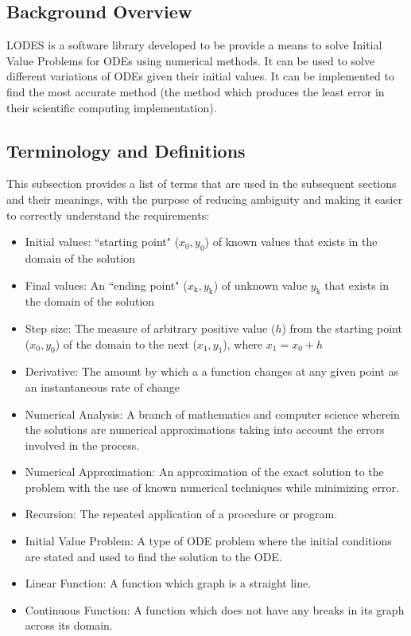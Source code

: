 \documentclass[12pt]{article}
\newcommand{\famname}{LODES} %
\begin{document}
\subsection{Background Overview} \label{Sec_Background}
\famname{} is a software library developed to be provide a means to solve Initial Value
Problems for ODEs using numerical methods. It can be used to solve different variations of ODEs
given their initial values. It can be implemented to find the most accurate method (the method
which produces the least error in their scientific computing implementation).

\subsection{Terminology and  Definitions}

This subsection provides a list of terms that are used in the subsequent
sections and their meanings, with the purpose of reducing ambiguity and making it
easier to correctly understand the requirements:

\begin{itemize}

\item Initial values: ``starting point" ($x_\text{0}, y_\text{0}$) of known values that
exists in the domain of the solution

\item Final values: An ``ending point" ($x_\text{k}, y_\text{k}$) of unknown value $y_\text{k}$
that exists in the domain of the solution

\item Step size: The measure of arbitrary positive value ($h$) from the starting point
($x_\text{0}, y_\text{0}$) of the domain to the next ($x_\text{1}, y_\text{1}$), where
$x_\text{1} = x_\text{0} + h$

\item Derivative: The amount by which a a function changes at any given point as an
instantaneous rate of change

\item Numerical Analysis: A branch of mathematics and computer science wherein the solutions
are numerical approximations taking into account the errors involved in the process.

\item Numerical Approximation: An approximation of the exact solution to the problem with the
use of known numerical techniques while minimizing error.

\item Recursion: The repeated application of a procedure or program.

\item Initial Value Problem: A type of ODE problem where the initial conditions are stated and
used to find the solution to the ODE.

\item Linear Function: A function which graph is a straight line.

\item Continuous Function: A function which does not have any breaks in its graph across its domain.

\end{itemize}
\end{document}
